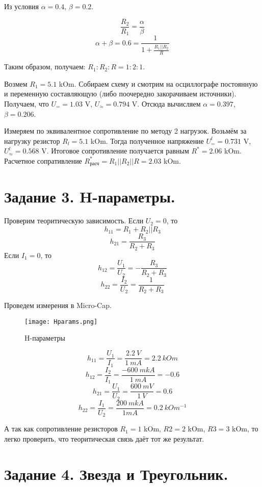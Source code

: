     \noindent Из условия $\alpha = 0.4$, $\beta = 0.2$.

    \[ \frac{R_2}{R_1} = \frac{\alpha}{\beta} \]
    \[ \alpha + \beta = 0.6 = \frac{1}{1 + \frac{R_1 || R_2}{R}} \]

    \noindent Таким образом, получаем: $R_1 : R_2 : R = 1 : 2 : 1$.

    \noindent Возмем $R_1 = 5.1$ kOm. Собираем схему и смотрим на осциллографе постоянную и 
    переменную составляющую (либо поочередно закорачиваем источники). 
    Получаем, что $U_{=} = 1.03$ V, $U_{\approx} = 0.794$ V. Отсюда вычисляем $\alpha = 0.397$, $\beta =  0.206$.

    \noindent Измеряем по эквивалентное сопротивление по методу 2 нагрузок.
    Возьмём за нагрузку резистор $R_l = 5.1$ kOm. Тогда полученное напряжение
    $U^l_{=} = 0.731$ V, $U^l_{\approx} = 0.568$ V.
    Итоговое сопротивление получается равным $R^* = 2.06$ kOm. Расчетное сопративление
    $R^*_{\text{расч}} = R_1 || R_2 || R = 2.03$ kOm.

    \section*{Задание 3. H-параметры.}

    \noindent Проверим теоритическую зависимость. Если $U_2 = 0$, то
    \[ h_{11} = R_1 + R_2 || R_3 \]
    \[ h_{21} = \frac{R_3}{R_2 + R_3} \]
    Если $I_1 = 0$, то
    \[ h_{12} = \frac{U_1}{U_2} = - \frac{R_3}{R_2 + R_3} \]
    \[ h_{22} = \frac{I_2}{U_2} = \frac{1}{R_2 + R_3} \] 

    Проведем измерения в Micro-Cap.
    \begin{figure}[h!]
        \centering
        \texttt{[image: Hparams.png]}
        \caption{H-параметры}
    \end{figure}

    \[ h_{11} = \frac{U_1}{I_1} = \frac{2.2 ~ V}{1 ~ mA} = 2.2 ~ kOm \]
    \[ h_{12} = \frac{I_2}{I_1} = \frac{-600 ~ mkA}{1 ~ mA} = -0.6 \]
    \[ h_{21} = \frac{U_1}{U_2} = \frac{600 ~ mV}{1 ~ V} = 0.6 \]
    \[ h_{22} = \frac{I_1}{U_2} = \frac{200 ~ mkA}{1 mA} = 0.2 ~ kOm^{-1} \]

    \noindent А так как сопротивление резисторов $R_1 = 1$ kOm, $R2 = 2$ kOm,
    $R3 = 3$ kOm, то легко проверить, что теоритическая связь даёт тот же
    результат.

    \section*{Задание 4. Звезда и Треугольник.}

